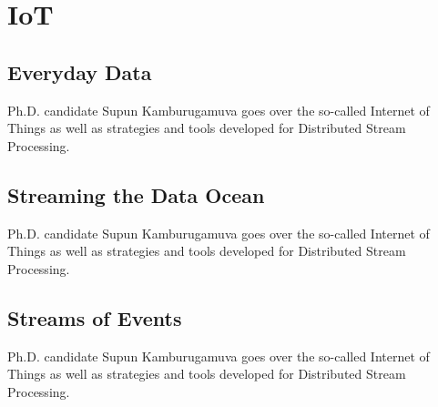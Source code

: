


\chapter{IoT}
\label{sec:icloud-iot}

\FILENAME


\section{Everyday Data}

Ph.D. candidate Supun Kamburugamuva goes over the so-called Internet of
Things as well as strategies and tools developed for Distributed Stream
Processing.




\section{Streaming the Data Ocean}

Ph.D. candidate Supun Kamburugamuva goes over the so-called Internet of
Things as well as strategies and tools developed for Distributed Stream
Processing.



\section{Streams of Events}

Ph.D. candidate Supun Kamburugamuva goes over the so-called Internet of
Things as well as strategies and tools developed for Distributed Stream
Processing.


